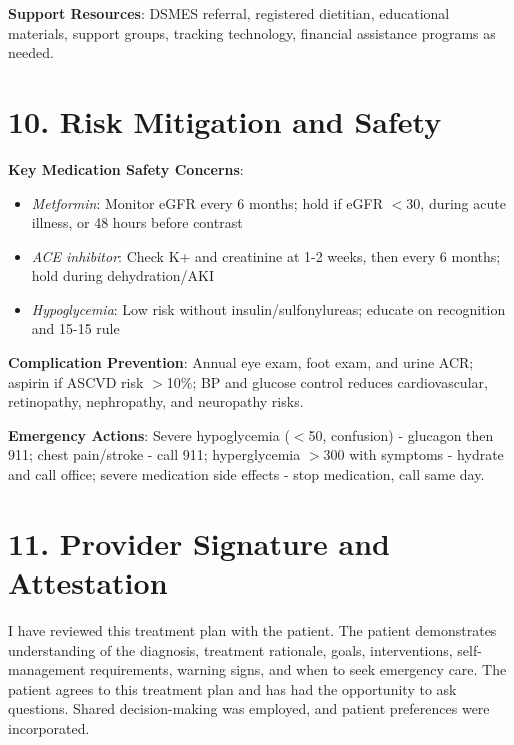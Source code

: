 \documentclass[11pt,letterpaper]{article}
\begin{document}
\vspace{0.5em}
\textbf{Support Resources}: DSMES referral, registered dietitian, educational materials, support groups, tracking technology, financial assistance programs as needed.

\section*{10. Risk Mitigation and Safety}

\textbf{Key Medication Safety Concerns}:
\begin{itemize}[leftmargin=*,itemsep=0pt]
    \item \textit{Metformin}: Monitor eGFR every 6 months; hold if eGFR $<$30, during acute illness, or 48 hours before contrast
    \item \textit{ACE inhibitor}: Check K+ and creatinine at 1-2 weeks, then every 6 months; hold during dehydration/AKI
    \item \textit{Hypoglycemia}: Low risk without insulin/sulfonylureas; educate on recognition and 15-15 rule
\end{itemize}

\vspace{0.5em}
\textbf{Complication Prevention}: Annual eye exam, foot exam, and urine ACR; aspirin if ASCVD risk $>$10\%; BP and glucose control reduces cardiovascular, retinopathy, nephropathy, and neuropathy risks.

\vspace{0.5em}
\textbf{Emergency Actions}: Severe hypoglycemia ($<$50, confusion) - glucagon then 911; chest pain/stroke - call 911; hyperglycemia $>$300 with symptoms - hydrate and call office; severe medication side effects - stop medication, call same day.

\vspace{2em}

\section*{11. Provider Signature and Attestation}

I have reviewed this treatment plan with the patient. The patient demonstrates understanding of the diagnosis, treatment rationale, goals, interventions, self-management requirements, warning signs, and when to seek emergency care. The patient agrees to this treatment plan and has had the opportunity to ask questions. Shared decision-making was employed, and patient preferences were incorporated.
\end{document}
